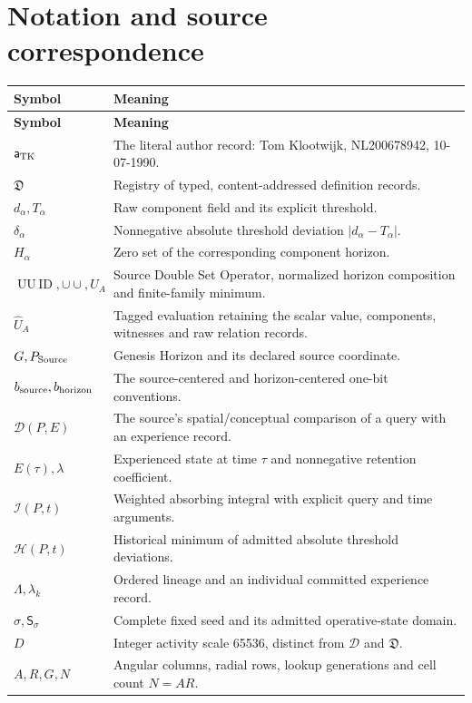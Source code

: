 \documentclass[11pt,a4paper]{article}
\numberwithin{equation}{section}
\newcommand{\newsec}[1]{\clearpage\section{#1}}
\newcommand{\uu}{\operatorname{UU\,ID}}
\newcommand{\dcup}{\mathbin{\cup\!\cup}}
\begin{document}
\newsec{Notation and source correspondence}
\label{app:notation}
\begin{longtable}{@{}p{}p{}@{}}
\toprule\textbf{Symbol} & \textbf{Meaning}\\\midrule\endfirsthead
\toprule\textbf{Symbol} & \textbf{Meaning}\\\midrule\endhead
\bottomrule\endlastfoot
$\mathsf a_{\rm TK}$ & The literal author record: Tom Klootwijk, NL200678942, 10-07-1990.\\[5pt]
$\mathfrak D$ & Registry of typed, content-addressed definition records.\\[5pt]
$d_\alpha,T_\alpha$ & Raw component field and its explicit threshold.\\[5pt]
$\delta_\alpha$ & Nonnegative absolute threshold deviation $|d_\alpha-T_\alpha|$.\\[5pt]
$H_\alpha$ & Zero set of the corresponding component horizon.\\[5pt]
$\uu,\dcup,U_A$ & Source Double Set Operator, normalized horizon composition and finite-family minimum.\\[5pt]
$\widehat U_A$ & Tagged evaluation retaining the scalar value, components, witnesses and raw relation records.\\[5pt]
$G,P_{\rm Source}$ & Genesis Horizon and its declared source coordinate.\\[5pt]
$b_{\rm source},b_{\rm horizon}$ & The source-centered and horizon-centered one-bit conventions.\\[5pt]
$\mathcal D(P,E)$ & The source's spatial/conceptual comparison of a query with an experience record.\\[5pt]
$E(\tau),\lambda$ & Experienced state at time $\tau$ and nonnegative retention coefficient.\\[5pt]
$\mathcal I(P,t)$ & Weighted absorbing integral with explicit query and time arguments.\\[5pt]
$\mathcal H(P,t)$ & Historical minimum of admitted absolute threshold deviations.\\[5pt]
$\Lambda,\lambda_k$ & Ordered lineage and an individual committed experience record.\\[5pt]
$\sigma,\mathsf S_\sigma$ & Complete fixed seed and its admitted operative-state domain.\\[5pt]
$D$ & Integer activity scale 65536, distinct from $\mathcal D$ and $\mathfrak D$.\\[5pt]
$A,R,G,N$ & Angular columns, radial rows, lookup generations and cell count $N=AR$.\\[5pt]

\end{longtable}
\end{document}

